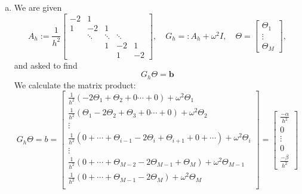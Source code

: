 \begin{enumerate}[a)]
  \item
\begin{comment}
  ``We are given the following linearized pendulum equations
\begin{equation}
  \theta^{\prime \prime}(t)+\omega^{2} \theta(t)=0, \quad 0<t<1, \quad \theta(0)=\alpha, \theta(1)=\beta
\end{equation}
  valid for small oscillations. We discretize with finite differences and obtain the numerical discretization on the grid $t_m=mh, m=0, \dots, M+1, h=\frac{1}{M+1}$ leading to the discretized equations.''

  $$ \frac{1}{h^{2}}\left(\Theta_{m-1}-2 \Theta_{m}+\Theta_{m+1}\right)+\omega^{2} \Theta_{m}=0, \quad m=1,2, \ldots, M $$
\end{comment}

We are given
$$ A_{h}:=\frac{1}{h^{2}}\left[\begin{array}{ccccc}
-2 & 1 & & & \\
1 & -2 & 1 & & \\
& \ddots & \ddots & \ddots & \\
& & 1 & -2 & 1 \\
& & & 1 & -2
\end{array}\right] , \quad G_{h}=:A_{h}+\omega^{2} I, \quad \Theta=\left[\begin{array}{c}
\Theta_{1} \\
\vdots \\
\Theta_{M}
\end{array}\right],$$
and asked to find
  $$ G_{h} \Theta=\mathbf{b}$$
We calculate the matrix product:
$$
G_h\Theta = b =
\begin{bmatrix}
  \frac{1}{h^2}\left(-2\Theta_1 + \Theta_2 + 0 \cdots + 0 \right) + \omega^2\Theta_1 \\
  \frac{1}{h^2}\left(\Theta_1 - 2\Theta_2 + \Theta_3 + 0 \cdots + 0 \right) + \omega^2\Theta_2 \\
  \vdots \\
  \frac{1}{h^2}\left(0 + \cdots + \Theta_{i-1}-2\Theta_{i}+ \Theta_{i+1} + 0 + \cdots \right) + \omega^2\Theta_{i}\\
  \vdots \\
  \frac{1}{h^2}\left(0 + \cdots + \Theta_{M-2} -2\Theta_{M-1} + \Theta_{M}\right) + \omega^2\Theta_{M-1}\\
  \frac{1}{h^2}\left(0 + \cdots + \Theta_{M-1} -2\Theta_M \right) + \omega^2\Theta_M \\
\end{bmatrix}
=
\begin{bmatrix}
  \frac{-\alpha}{h^2} \\
  0 \\
  \vdots \\
  0 \\
  \frac{-\beta}{h^2}
\end{bmatrix}
$$


\end{enumerate}
